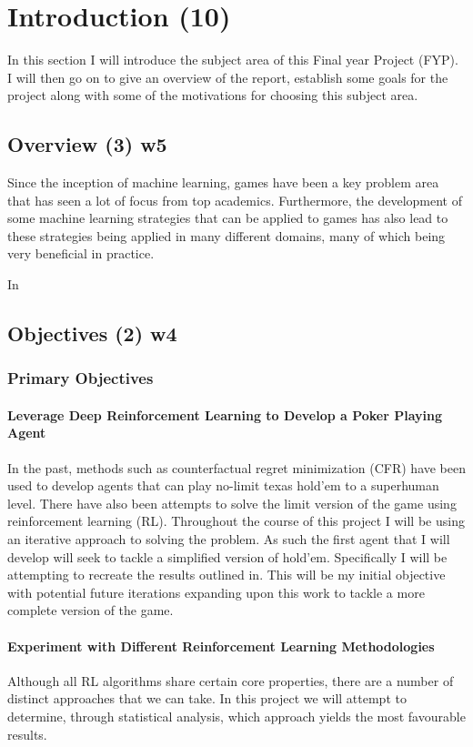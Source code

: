 \chapter{Introduction (10)}
\label{ch:intro}
In this section I will introduce the subject area of this Final year Project (FYP).
I will then go on to give an overview of the report, establish some goals for the project along with some of
the motivations for choosing this subject area.


\section{Overview (3) w5}\label{sec:overview}
Since the inception of machine learning, games have been a key problem area that has seen a lot of focus from
top academics.
Furthermore, the development of some machine learning strategies that can be applied to games has also lead to these
strategies being applied in many different domains, many of which being very beneficial in practice.

In


\section{Objectives (2) w4}\label{sec:objectives}
\subsection{Primary Objectives}\label{subsec:primaryObjectives}
\subsubsection{Leverage Deep Reinforcement Learning to Develop a Poker Playing Agent}
In the past, methods such as counterfactual regret minimization (CFR) have been used to develop agents that can
play no-limit texas hold'em to a superhuman level.
There have also been attempts to solve the limit version of the game using reinforcement learning (RL).
Throughout the course of this project I will be using an iterative approach to solving the problem.
As such the first agent that I will develop will seek to tackle a simplified version of hold'em.
Specifically I will be attempting to recreate the results outlined in\citep{dahl2001reinforcement}.
This will be my initial objective with potential future iterations expanding upon this work to tackle a more complete
version of the game.

\subsubsection{Experiment with Different Reinforcement Learning Methodologies}
Although all RL algorithms share certain core properties, there are a number of distinct approaches that we can take.
In this project we will attempt to determine, through statistical analysis, which approach yields the most favourable results.

